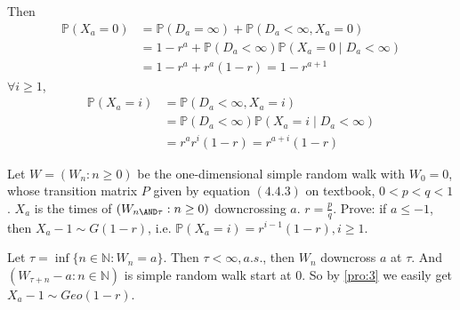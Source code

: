 \documentclass{ctexart}
\begin{document}
\begin{solution}
\begin{enumerate}
      Then \[
        \begin{aligned}
          \mathbb{P}(X_a=0) & =\mathbb{P}(D_a=\infty) + \mathbb{P}(D_a < \infty, X_a=0)            \\
                            & =1-r^a + \mathbb{P}(D_a < \infty)\mathbb{P}(X_a=0 \mid D_a < \infty) \\
                            & =1-r^a + r^a(1-r)=1-r^{a + 1}
        \end{aligned}
      \]
      \(\forall i \geq 1\),
      \[
        \begin{aligned}
          \mathbb{P}(X_a=i) & =\mathbb{P}(D_a< \infty,X_a=i)                                    \\
                            & =    \mathbb{P}(D_a< \infty)\mathbb{P}(X_a = i \mid D_a < \infty) \\
                            & =r^ar^i(1-r)=r^{a + i}(1-r)
        \end{aligned}
      \]
  \end{enumerate}
\end{solution}
\begin{problem}\label{pro:4}
  Let \(W=(W_n:n \geq 0)\) be the one-dimensional simple random walk with \(W_0=0\),
  whose transition matrix \(P\) given by equation \((4.4.3)\)
  on textbook, \(0< p<q<1\).
  \(X_a\) is the times of \((W_{n \AND \tau}:n \geq 0)\) downcrossing \(a\).
  \(r=\frac{p}{q}\).
  Prove: if \(a \leq -1\), then \(X_a-1 \sim G(1-r)\), i.e. \(\mathbb{P}(X_a=i)=r^{i-1}(1-r),i \geq 1\).
\end{problem}
\begin{solution}
  Let \(\tau=\inf \{n \in \mathbb{N}:W_n=a\}\). Then \(\tau < \infty,a. s.\), then \(W_n\) downcross \(a\) at \(\tau\).
  And \((W_{\tau+n}-a:n \in \mathbb{N})\) is simple random walk start at \(0\).
  So by \ref{pro:3} we easily get \(X_a -1\sim Geo(1-r)\).
\end{solution}
\end{document}
